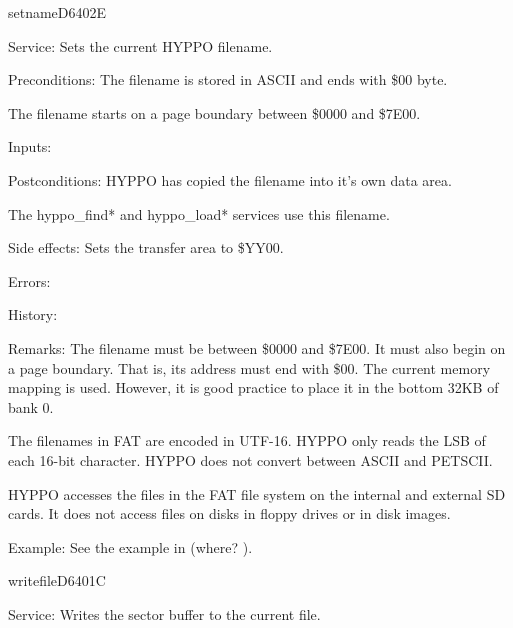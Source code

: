 %
\newpage
\begin{hyppotrap}{setname}{D640}{2E}
\item [Service:]
  Sets the current HYPPO filename.
\item [Preconditions:]
  The filename is stored in ASCII and ends with \$00 byte.

  The filename starts on a page boundary between \$0000 and \$7E00.
\item [Inputs:]
\item [Postconditions:]
  HYPPO has copied the filename into it's own data area.

  The hyppo\_find* and hyppo\_load* services use this filename.
\item [Side effects:]
  Sets the transfer area to \$YY00.
\item [Errors:]
\item [History:]
\item [Remarks:]
  The filename must be between \$0000 and \$7E00. It must also begin on a
  page boundary. That is, its address must end with \$00. The current memory
  mapping is used. However, it is good practice to place it in the bottom 32KB
  of bank 0.

  The filenames in FAT are encoded in UTF-16. HYPPO only reads the LSB
  of each 16-bit character. HYPPO does not convert between ASCII and
  PETSCII.

  HYPPO accesses the files in the FAT file system on the internal and
  external SD cards. It does not access files on disks in floppy drives or in
  disk images.
\item [Example:]
  See the example in (where? \TODO).
\end{hyppotrap}


\newpage
\begin{hyppotrap}{writefile}{D640}{1C}
\item [Service:]
  Writes the sector buffer to the current file.
\notimplemented
\end{hyppotrap}



